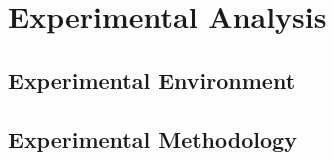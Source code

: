 \chapter{Experimental Analysis}

\section{Experimental Environment}

\section{Experimental Methodology}


